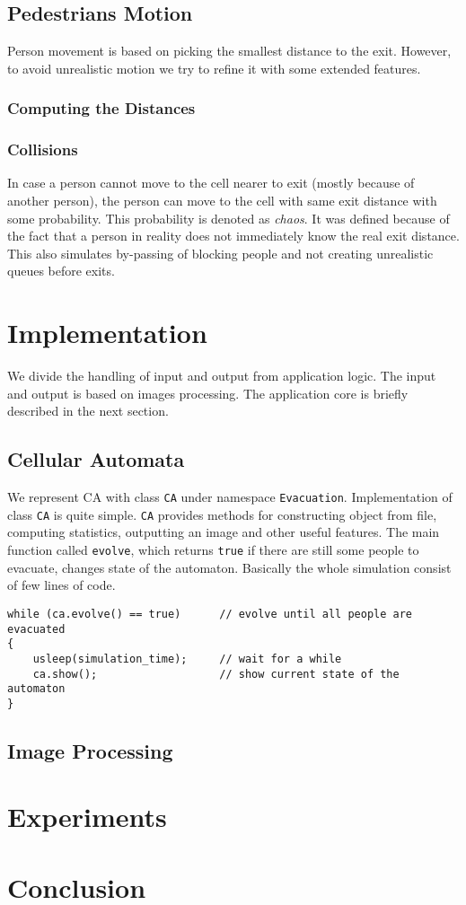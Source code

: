 \subsection{Pedestrians Motion}
Person movement is based on picking the smallest distance to the exit. However,
to avoid unrealistic motion we try to refine it with some extended features.

\subsubsection{Computing the Distances}

\subsubsection{Collisions}
In case a person cannot move to the cell nearer to exit (mostly because of
another person), the person can move to the cell with same exit distance with
some probability. This probability is denoted as \emph{chaos}. It was defined
because of the fact that a person in reality does not immediately know the real
exit distance. This also simulates by-passing of blocking people and not
creating unrealistic queues before exits.

\section{Implementation}
We divide the handling of input and output from application logic. The
input and output is based on images processing. The application core is briefly
described in the next section.

\subsection{Cellular Automata}
We represent CA with class \texttt{CA} under namespace \texttt{Evacuation}.
Implementation of class \texttt{CA} is quite simple. \texttt{CA} provides
methods for constructing object from file, computing statistics, outputting an
image and other useful features. The main function called \texttt{evolve},
which returns \texttt{true} if there are still some people to evacuate, changes
state of the automaton. Basically the whole simulation consist of few lines of
code.

\bigskip
\begin{lstlisting}
while (ca.evolve() == true)      // evolve until all people are evacuated
{
    usleep(simulation_time);     // wait for a while
    ca.show();                   // show current state of the automaton
}
\end{lstlisting}

\subsection{Image Processing}

\section{Experiments}

\section{Conclusion}
